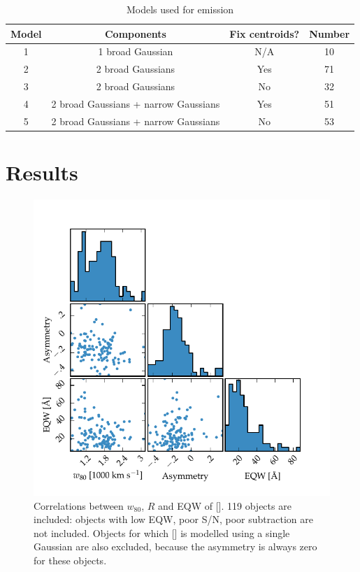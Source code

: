 \begin{table}
  \centering
  \small 
  \caption{Models used for \ha emission}
  \label{tab:hamod}
    \begin{tabular}{cccc} 
    \hline
    Model     & Components & Fix centroids? & Number \\
    \hline
    1        & 1 broad Gaussian  & N/A &  10 \\
    2        & 2 broad Gaussians & Yes &  71 \\
    3        & 2 broad Gaussians & No  &  32 \\
    4        & 2 broad Gaussians + narrow Gaussians & Yes & 51 \\
    5        & 2 broad Gaussians + narrow Gaussians & No  & 53 \\
    \hline
    \end{tabular}
\end{table} 

\section{Results}


\begin{figure}
    \includegraphics[width=\columnwidth]{figures/chapter04/parameters_grid.pdf} 
    \caption{Correlations between $w_{80}$, $R$ and EQW of []. 119 objects are included: objects with low \ac{EQW}, poor \ac{S/N}, poor  subtraction are not included. Objects for which [] is modelled using a single Gaussian are also excluded, because the asymmetry is always zero for these objects.}     
    \label{fig:parameters_grid}
\end{figure}

